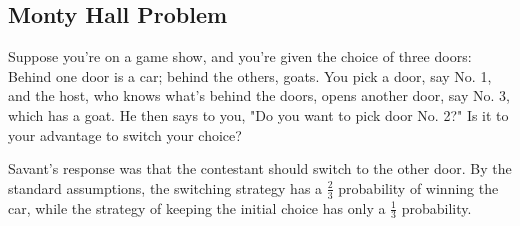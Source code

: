 \subsection{Monty Hall Problem}

Suppose you're on a game show, and you're given the choice of three doors: Behind one door is a car; behind the others, goats. You pick a door, say No. 1, and the host, who knows what's behind the doors, opens another door, say No. 3, which has a goat. He then says to you, "Do you want to pick door No. 2?" Is it to your advantage to switch your choice?

Savant's response was that the contestant should switch to the other door. By the standard assumptions, the switching strategy has a $\frac{2}{3}$ probability of winning the car, while the strategy of keeping the initial choice has only a $\frac{1}{3}$ probability.
